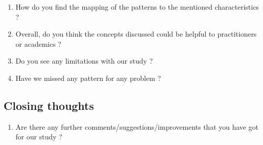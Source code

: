 \documentclass{bmcart}
\begin{document}
\begin{backmatter}
\begin{enumerate}
    \item How do you find the mapping of the patterns to the mentioned characteristics ? 
    \item Overall, do you think the concepts discussed could be helpful to practitioners or academics ?  
    \item Do you see any limitations with our study ? 
    \item Have we missed any pattern for any problem ?
\end{enumerate}

\subsection*{\textbf{Closing thoughts}}

\begin{enumerate}
    \item Are there any further comments/suggestions/improvements that you have got for our study ?
\end{enumerate}








\end{backmatter}
\end{document}
